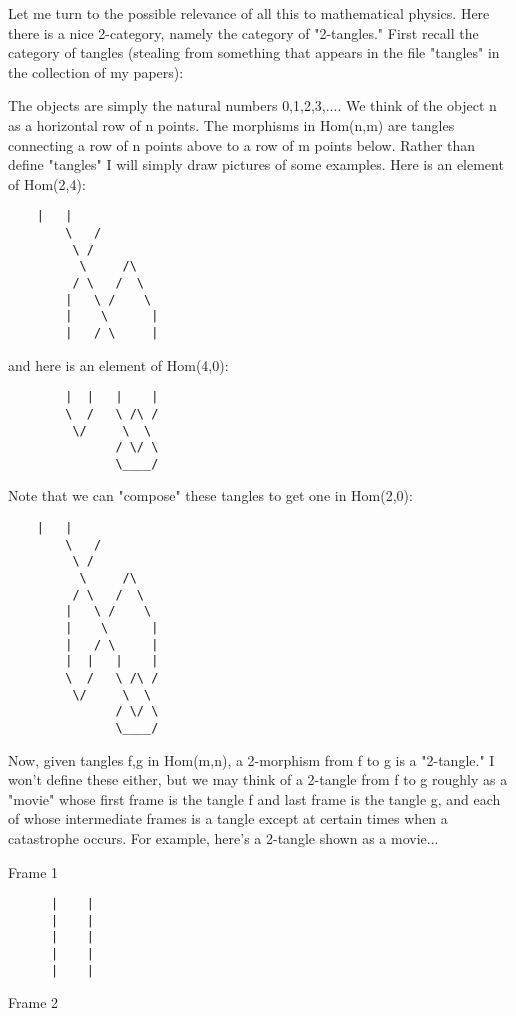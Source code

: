 Let me turn to the possible relevance of all this to mathematical
physics.  Here there is a nice 2-category, namely the category of 
"2-tangles."  First recall the category of tangles (stealing from something
that appears in the file "tangles" in the collection of my papers):

The objects are simply the natural numbers {0,1,2,3,...}.  We think
of the object n as a horizontal row of n points.  The morphisms
in Hom(n,m) are tangles connecting a row of n points above to a row of
m points below.  Rather than define "tangles" I will simply draw pictures of
some examples. Here is an element of Hom(2,4): 

\begin{verbatim}
 	|   |
        \   /
         \ /
          \     /\
         / \   /  \
        |   \ /    \
        |    \      |
        |   / \     |
\end{verbatim}
    

and here is an element of Hom(4,0):

\begin{verbatim}
        |  |   |    |
        \  /   \ /\ /
         \/     \  \
               / \/ \
               \____/
\end{verbatim}
    

Note that we can "compose" these tangles to get one in Hom(2,0):

\begin{verbatim}
 	|   |
        \   /
         \ /
          \     /\
         / \   /  \
        |   \ /    \
        |    \      |
        |   / \     |
        |  |   |    |
        \  /   \ /\ /
         \/     \  \
               / \/ \
               \____/
\end{verbatim}
    

Now, given tangles f,g in Hom(m,n), a 2-morphism from f to g is 
a "2-tangle."   I won't define these either, but we may think of a 2-tangle
from f to g roughly as a "movie" whose first frame is the tangle f and
last frame is the tangle g, and each of whose intermediate frames is a
tangle except at certain times when a catastrophe occurs.   For example,
here's a 2-tangle shown as a movie... 

Frame 1  

\begin{verbatim}
      |    |
      |    |
      |    |
      |    |
      |    |
\end{verbatim}
    

Frame 2 

